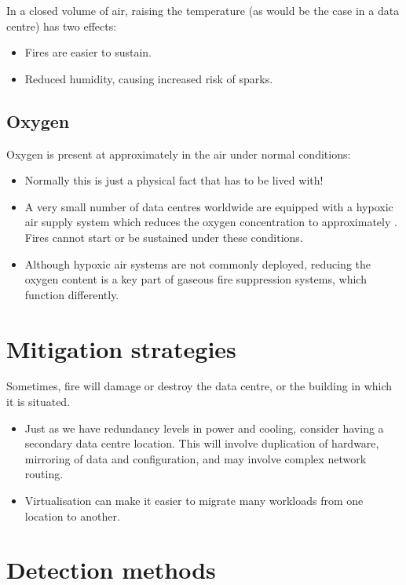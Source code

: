 \documentclass{pgnotes}
\begin{document}
In a closed volume of air, raising the temperature (as would be the case
in a data centre) has two effects:

\begin{itemize}
\item
  Fires are easier to sustain.
\item
  Reduced humidity, causing increased risk of sparks.
\end{itemize}

\subsection{Oxygen}
\label{sec:oxygen}

Oxygen is present at approximately in the air under normal conditions:

\begin{itemize}
\item
  Normally this is just a physical fact that has to be lived with!
\item
  A very small number of data centres worldwide are equipped with a
  hypoxic air supply system which reduces the oxygen concentration to
  approximately . Fires cannot start or be sustained under these
  conditions.
\item
  Although hypoxic air systems are not commonly deployed, reducing the
  oxygen content is a key part of gaseous fire suppression systems,
  which function differently.
\end{itemize}

\section{Mitigation strategies}
\label{sec:mitigation-strategies}

Sometimes, fire will damage or destroy the data centre, or the building
in which it is situated.

\begin{itemize}
\item
  Just as we have redundancy levels in power and cooling, consider
  having a secondary data centre location. This will involve duplication
  of hardware, mirroring of data and configuration, and may involve
  complex network routing.
\item
  Virtualisation can make it easier to migrate many workloads from one
  location to another.
\end{itemize}

\section{Detection methods}
\label{sec:detection-methods}
\end{document}
